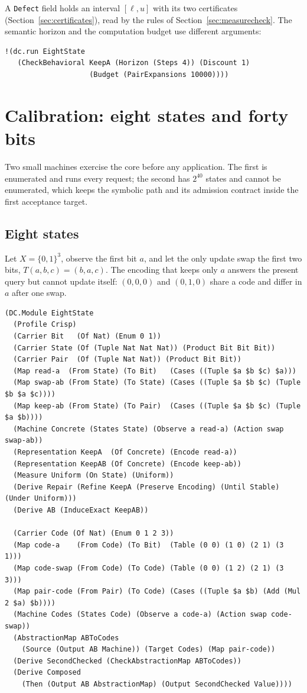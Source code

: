 \documentclass[11pt]{article}
\newcommand{\code}[1]{\texttt{#1}}
\theoremstyle{definition}
\theoremstyle{plain}
\begin{document}
A \code{Defect} field holds an interval $[\ell,u]$ with its two certificates
(Section~\ref{sec:certificates}), read by the rules of Section~\ref{sec:measurecheck}. The semantic
horizon and the computation budget use different arguments:
\begin{lstlisting}
!(dc.run EightState
   (CheckBehavioral KeepA (Horizon (Steps 4)) (Discount 1)
                    (Budget (PairExpansions 10000))))
\end{lstlisting}

\section{Calibration: eight states and forty bits}\label{sec:calib}

Two small machines exercise the core before any application. The first is enumerated and runs
every request; the second has $2^{40}$ states and cannot be enumerated, which keeps the symbolic
path and its admission contract inside the first acceptance target.

\subsection{Eight states}

Let $X=\{0,1\}^3$, observe the first bit $a$, and let the only update swap the first two bits,
$T(a,b,c)=(b,a,c)$. The encoding that keeps only $a$ answers the present query but cannot update
itself: $(0,0,0)$ and $(0,1,0)$ share a code and differ in $a$ after one swap.

\begin{lstlisting}[basicstyle=\ttfamily\footnotesize,title={\scriptsize\ttfamily fixtures/eight\_state.metta}]
(DC.Module EightState
  (Profile Crisp)
  (Carrier Bit   (Of Nat) (Enum 0 1))
  (Carrier State (Of (Tuple Nat Nat Nat)) (Product Bit Bit Bit))
  (Carrier Pair  (Of (Tuple Nat Nat)) (Product Bit Bit))
  (Map read-a  (From State) (To Bit)   (Cases ((Tuple $a $b $c) $a)))
  (Map swap-ab (From State) (To State) (Cases ((Tuple $a $b $c) (Tuple $b $a $c))))
  (Map keep-ab (From State) (To Pair)  (Cases ((Tuple $a $b $c) (Tuple $a $b))))
  (Machine Concrete (States State) (Observe a read-a) (Action swap swap-ab))
  (Representation KeepA  (Of Concrete) (Encode read-a))
  (Representation KeepAB (Of Concrete) (Encode keep-ab))
  (Measure Uniform (On State) (Uniform))
  (Derive Repair (Refine KeepA (Preserve Encoding) (Until Stable) (Under Uniform)))
  (Derive AB (InduceExact KeepAB))

  (Carrier Code (Of Nat) (Enum 0 1 2 3))
  (Map code-a    (From Code) (To Bit)  (Table (0 0) (1 0) (2 1) (3 1)))
  (Map code-swap (From Code) (To Code) (Table (0 0) (1 2) (2 1) (3 3)))
  (Map pair-code (From Pair) (To Code) (Cases ((Tuple $a $b) (Add (Mul 2 $a) $b))))
  (Machine Codes (States Code) (Observe a code-a) (Action swap code-swap))
  (AbstractionMap ABToCodes
    (Source (Output AB Machine)) (Target Codes) (Map pair-code))
  (Derive SecondChecked (CheckAbstractionMap ABToCodes))
  (Derive Composed
    (Then (Output AB AbstractionMap) (Output SecondChecked Value))))
\end{lstlisting}
\end{document}

